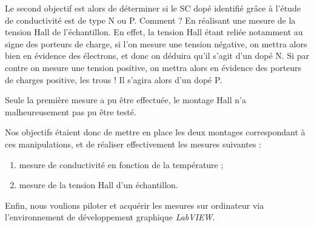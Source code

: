 Le second objectif est alors de déterminer si le SC dopé identifié grâce à l'étude de 
conductivité est de type N ou P.
Comment ? En réalisant une mesure de la tension Hall de l'échantillon.
En effet, la tension Hall étant reliée notamment au signe des porteurs de charge, si l'on mesure une tension négative, 
on mettra alors bien en évidence des électrons, et donc on déduira qu'il s'agit d'un dopé N.
Si par contre on mesure une tension positive, on mettra alors en évidence des porteurs de charges positive, les trous !
Il s'agira alors d'un dopé P.

Seule la première mesure a pu être effectuée, le montage Hall n'a malheureusement pas pu être testé.

\bigskip
Nos objectifs étaient donc de mettre en place les deux montages correspondant à ces manipulations, 
et de réaliser effectivement les mesures suivantes :
\begin{enumerate}
\item mesure de conductivité en fonction de la température ;
\item mesure de la tension Hall d'un échantillon.
\end{enumerate}
Enfin, nous voulions piloter et acquérir les mesures sur ordinateur via l'environnement 
de développement graphique \textit{LabVIEW}.
